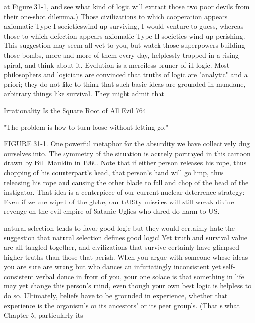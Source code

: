 at Figure 31-1, and see what kind of logic will extract those two poor devils from their
one-shot dilemma.) Those civilizations to which cooperation appears axiomatic-Type
I societieswind up surviving, I would venture to guess, whereas those to which
defection appears axiomatic-Type II societies-wind up perishing. This suggestion may
seem all wet to you, but watch those superpowers building those bombs, more and
more of them every day, helplessly trapped in a rising spiral, and think about it.
Evolution is a merciless pruner of ill logic.
        Most philosophers and logicians are convinced that truths of logic are
"analytic" and a priori; they do not like to think that such basic ideas are grounded in
mundane, arbitrary things like survival. They might admit that




Irrationality Is the Square Root of All Evil                                         764

                "The problem is how to turn loose without letting go."


FIGURE 31-1. One powerful metaphor for the absurdity we have collectively dug
ourselves into. The symmetry of the situation is acutely portrayed in this cartoon
drawn by Bill Mauldin in 1960. Note that if either person releases his rope, thus
chopping of his counterpart's head, that person's hand will go limp, thus releasing his
rope and causing the other blade to fall and chop of the head of the instigator. That
idea is a centerpiece of our current nuclear deterrence strategy: Even if we are wiped
of the globe, our trUSty missiles will still wreak divine revenge on the evil empire of
Satanic Uglies who dared do harm to US.

natural selection tends to favor good logic-but they would certainly hate the
suggestion that natural selection defines good logic! Yet truth and survival value are
all tangled together, and civilizations that survive certainly have glimpsed higher
truths than those that perish. When you argue with someone whose ideas you are sure
are wrong but who dances an infuriatingly inconsistent yet self-consistent verbal
dance in front of you, your one solace is that something in life may yet change this
person's mind, even though your own best logic is helpless to do so. Ultimately,
beliefs have to be grounded in experience, whether that experience is the organism's
or its ancestors' or its peer group's. (That s what Chapter 5, particularly its




